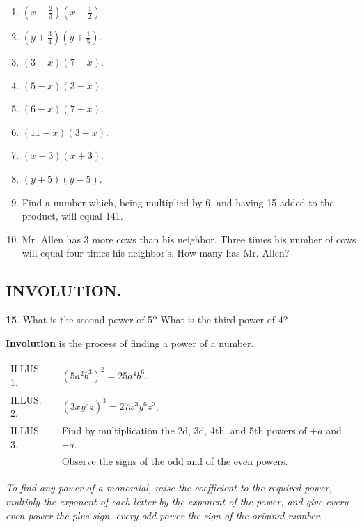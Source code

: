 \documentclass{book}
\begin{document}
\begin{enumerate}
\item $(x - \frac{2}{3})(x - \frac{1}{2})$.

\item $(y + \frac{3}{4})(y + \frac{1}{5})$.

\item $(3-x)(7-x)$.

\item $(5-x)(3-x)$.

\item $(6-x)(7+x)$.

\item$(11-x)(3+x)$.

\item$(x-3)(x+3)$.

\item $(y+5)(y-5)$.

\item Find a number which, being multiplied by 6, and having 15
added to the product, will equal 141.

\item Mr. Allen has 3 more cows than his neighbor. Three times his
number of cows will equal four times his neighbor's. How many has
Mr. Allen?
\end{enumerate}

\subsection*{INVOLUTION.}

\textbf{ 15}. What is the second power of 5? What is the third
power of 4?

\textbf{ Involution} is the process of finding a power of a
number.

\begin{tabular}{ll}
ILLUS. 1. & $(5 a^2 b^3)^2 = 25 a^4 b^6$.\\
ILLUS. 2. & $(3 x y^2 z)^3 = 27 x^3 y^6 z^3$.\\
ILLUS. 3. & Find by multiplication the 2d, 3d, 4th,
and 5th powers of $+a$ and $-a$.\\
& Observe the signs of the odd and of the even powers.
\end{tabular}

\textit{To find any power of a monomial, raise the coefficient to
the required power, multiply the exponent of each letter by the
exponent of the power, and give every even power the plus sign,
every odd power the sign of the original number}.
\end{document}

